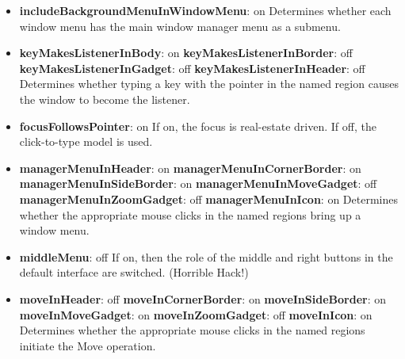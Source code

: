 \begin{itemize}
\item {\bf includeBackgroundMenuInWindowMenu}: on\newline{}
Determines whether each window menu has the main window manager
menu as a submenu.

\item {\bf keyMakesListenerInBody}: on\newline{}
{\bf keyMakesListenerInBorder}: off\newline{}
{\bf keyMakesListenerInGadget}: off\newline{}
{\bf keyMakesListenerInHeader}: off\newline{}
Determines whether typing a key with the pointer in the named
region causes the window to become the listener.

\item {\bf focusFollowsPointer}: on\newline{}
If on, the focus is real-estate driven.  If off, the click-to-type
model is used.

\item {\bf managerMenuInHeader}: on\newline{}
{\bf managerMenuInCornerBorder}: on\newline{}
{\bf managerMenuInSideBorder}: on\newline{}
{\bf managerMenuInMoveGadget}: off\newline{}
{\bf managerMenuInZoomGadget}: off\newline{}
{\bf managerMenuInIcon}: on\newline{}
Determines whether the appropriate mouse clicks in the named
regions bring up a window menu.

\item {\bf middleMenu}: off\newline{}
If on, then the role of the middle and right buttons in the
default interface are switched. (Horrible Hack!)

\item {\bf moveInHeader}: off\newline{}
{\bf moveInCornerBorder}: on\newline{}
{\bf moveInSideBorder}: on\newline{}
{\bf moveInMoveGadget}: on\newline{}
{\bf moveInZoomGadget}: off\newline{}
{\bf moveInIcon}: on\newline{}
Determines whether the appropriate mouse clicks in the named
regions initiate the Move operation.


\end{itemize}
